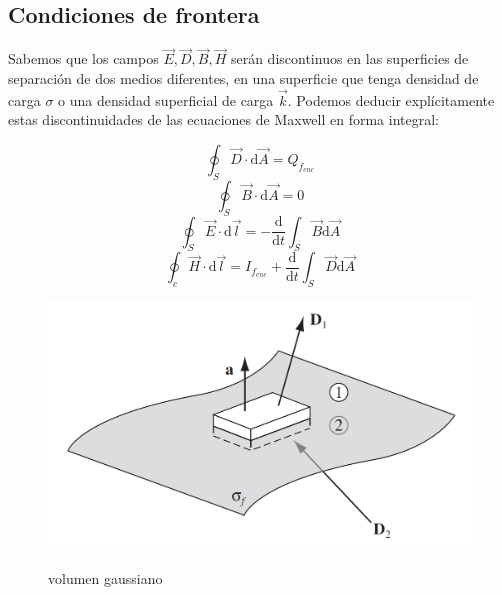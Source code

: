\documentclass[12pt]{article}
\newcommand{\D}{\mathrm{d}}
\begin{document}
\subsection{Condiciones de frontera}

Sabemos que los campos $\vec{E}, \vec{D}, \vec{B}, \vec{H}$ serán discontinuos en las superficies de separación de dos medios diferentes, en una superficie que tenga densidad de carga $\sigma$ o una densidad superficial de carga $\vec{k}$. Podemos deducir explícitamente estas discontinuidades de las ecuaciones de Maxwell en forma  integral:


\begin{equation}
\oint_S \vec{D} \cdot \D \vec{A} =  Q_{f_{enc}} \label{Ec:6.1-1EcMaxInt}
\end{equation}
\begin{equation}
\oint_S \vec{B} \cdot \D \vec{A} =  0  \label{Ec:6.1-2EcMaxInt}
\end{equation}
\begin{equation}
\oint_S \vec{E} \cdot \D \vec{l} =  - \dfrac{\D }{\D t} \int_S \vec{B} \D \vec{A} \label{Ec:6.1-3EcMaxInt}
\end{equation}
\begin{equation}
\oint_c \vec{H} \cdot \D \vec{l} =  I_{f_{enc}} +  \dfrac{\D }{\D t} \int_S \vec{D}\label{Ec:6.1-4EcMaxInt} \D \vec{A}
\end{equation}

\begin{figure}[h!] \centering
\includegraphics[scale=0.3]{condicionesmaxwell1.png}
\label{Fig:6.1}
\caption{volumen gaussiano}
\end{figure}
\end{document}
